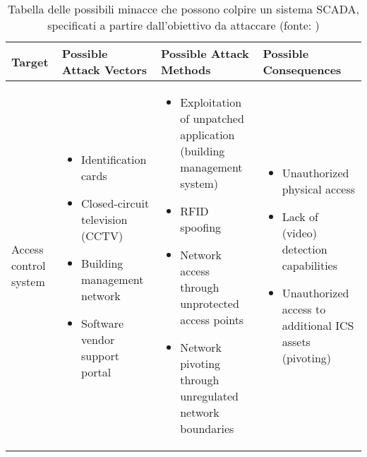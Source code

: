 \footnotesize
\begin{longtable}[tbh]{@{}XXXX@{}}
\caption{Tabella delle possibili minacce che possono colpire un sistema SCADA, specificati a partire dall'obiettivo da attaccare (fonte: \cite{Knapp_2015_7})}
\label{tab:threat_table}
\\
\toprule
\textbf{Target} & \textbf{Possible Attack Vectors} & \textbf{Possible Attack Methods} & \textbf{Possible Consequences} \\
\midrule
%
\endhead
%
Access control system & \vspace{-\baselineskip} \begin{itemize} [nosep,leftmargin=*] \item Identification cards \item Closed-circuit television (CCTV) \item Building management network \item Software vendor support portal \vspace{-\baselineskip} \end{itemize} & \vspace{-\baselineskip} \begin{itemize} [nosep,leftmargin=*] \item Exploitation of unpatched application (building management system) \item RFID spoofing \item Network access through unprotected access points \item Network pivoting through unregulated network boundaries \vspace{-\baselineskip} \end{itemize} & \vspace{-\baselineskip} \begin{itemize} [nosep,leftmargin=*] \item Unauthorized physical access \item Lack of (video) detection capabilities \item Unauthorized access to additional ICS assets (pivoting) \vspace{-\baselineskip} \end{itemize}
\\ \midrule

\end{longtable}
